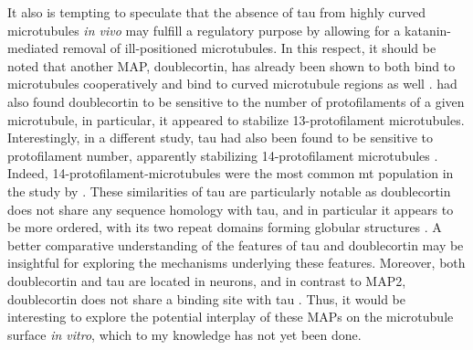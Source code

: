 It also is tempting to speculate that the absence of tau from highly curved microtubules \textit{in vivo} may fulfill a regulatory purpose by allowing for a katanin-mediated removal of ill-positioned microtubules. In this respect, it should be noted that another MAP, doublecortin, has already been shown to both bind to microtubules cooperatively and bind to curved microtubule regions as well \parencite{Bechstedt2012, Bechstedt2014}. \cite{Bechstedt2012} had also found doublecortin to be sensitive to the number of protofilaments of a given microtubule, in particular, it appeared to stabilize 13-protofilament microtubules. Interestingly, in a different study, tau had also been found to be sensitive to protofilament number, apparently stabilizing 14-protofilament microtubules . Indeed, 14-protofilament-microtubules were the most common mt population in the study by \cite{Kellogg2018}. These similarities of tau are particularly notable as doublecortin does not share any sequence homology with tau, and in particular it appears to be more ordered, with its two repeat domains forming globular structures . A better comparative understanding of the features of tau and doublecortin may be insightful for exploring the mechanisms underlying these features. Moreover, both doublecortin and tau are located in neurons, and in contrast to MAP2, doublecortin does not share a binding site with tau . Thus, it would be interesting to explore the potential interplay of these MAPs on the microtubule surface \textit{in vitro}, which to my knowledge has not yet been done. \par

